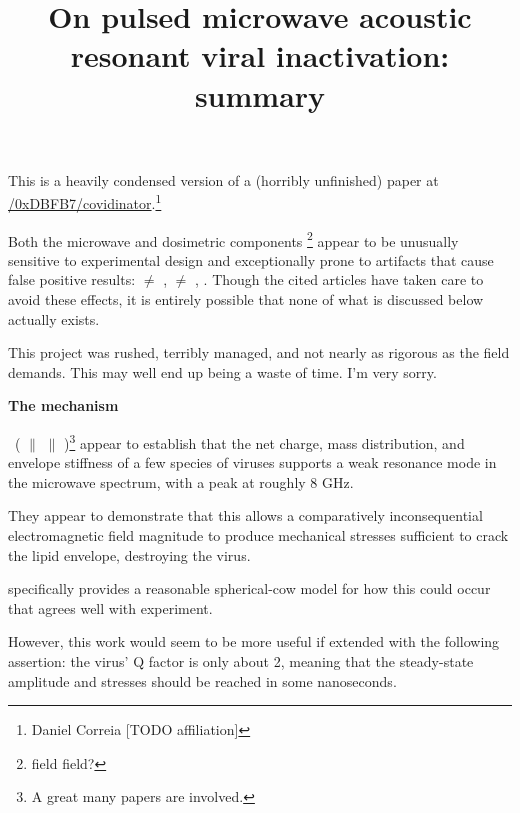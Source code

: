 \documentclass[fleqn,10pt]{paper}
\title{On pulsed microwave acoustic resonant viral inactivation: summary}
\begin{document}
\maketitle


This is a heavily condensed version of a (horribly unfinished) paper at \href{https://www.github.com/0xDBFB7/covidinator/documents/paper.pdf}{\faGithub/0xDBFB7/covidinator}.\footnote{Daniel Correia [TODO affiliation] }



Both the microwave and dosimetric components \footnote{field field?} appear to be unusually sensitive to experimental design and exceptionally prone to artifacts that cause false positive results: \cite{Microwave1982} $\neq$ \cite{Resonances1987}, \cite{Effects1985a} $\neq$ \cite{Cytogenetic1986}, \cite{Comprehensive2018}. Though the cited articles have taken care to avoid these effects, it is entirely possible that none of what is discussed below actually exists.  

This project was rushed, terribly managed, and not nearly as rigorous as the field demands. This may well end up being a waste of time. I'm very sorry.


{\Large \textbf{The mechanism}}


\cite{Microwave2009} \textrightarrow \ (\cite{focusing2014} $\parallel$ \cite{Efficient2015} $\parallel$ \cite{Resonant2017})\footnote{A great many papers are involved.} appear to establish that the net charge, mass distribution, and envelope stiffness of a few species of viruses supports a weak resonance mode in the microwave spectrum, with a peak at roughly 8 GHz.

They appear to demonstrate that this allows a comparatively inconsequential electromagnetic field magnitude to produce mechanical stresses sufficient to crack the lipid envelope, destroying the virus.

\cite{Efficient2015} specifically provides a reasonable spherical-cow model for how this could occur that agrees well with experiment.

However, this work would seem to be more useful if extended with the following assertion: the virus' Q factor is only about 2, meaning that the steady-state amplitude and stresses should be reached in some nanoseconds.
\end{document}
